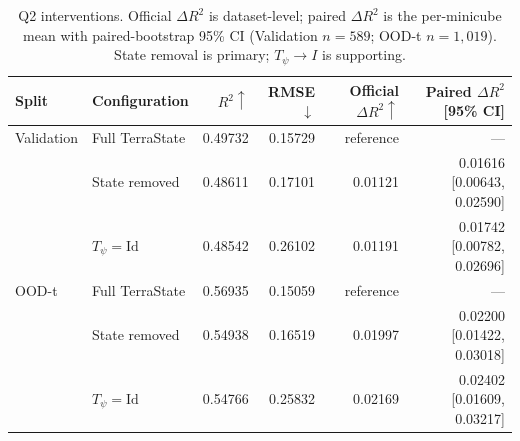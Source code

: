 \begin{table}[t]
\centering
{\small
\setlength{\tabcolsep}{6.0pt}
\renewcommand{\arraystretch}{0.70}
\begin{tabular}{llrrrr}
\toprule
Split & Configuration & $R^2\uparrow$ & RMSE$\downarrow$ &
Official $\Delta R^2\uparrow$ & Paired $\Delta R^2$ [95\% CI]\\
\midrule
Validation & Full TerraState & 0.49732 & 0.15729 & reference & ---\\
& State removed & 0.48611 & 0.17101 & 0.01121 &
0.01616 [0.00643, 0.02590]\\
& $T_\psi=\mathrm{Id}$ & 0.48542 & 0.26102 & 0.01191 &
0.01742 [0.00782, 0.02696]\\
\midrule
OOD-t & Full TerraState & 0.56935 & 0.15059 & reference & ---\\
& State removed & 0.54938 & 0.16519 & 0.01997 &
0.02200 [0.01422, 0.03018]\\
& $T_\psi=\mathrm{Id}$ & 0.54766 & 0.25832 & 0.02169 &
0.02402 [0.01609, 0.03217]\\
\bottomrule
\end{tabular}
}
\caption{Q2 interventions. Official $\Delta R^2$ is dataset-level; paired
$\Delta R^2$ is the per-minicube mean with paired-bootstrap 95\% CI
(Validation $n=589$; OOD-t $n=1{,}019$). State removal is primary;
$T_\psi\!\rightarrow I$ is supporting.}
\label{tab:q2}
\end{table}
